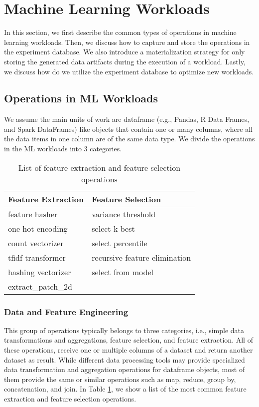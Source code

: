\section{Machine Learning Workloads} \label{sec-ml-workloads}
In this section, we first describe the common types of operations in machine learning workloads.
Then, we discuss how to capture and store the operations in the experiment database.
We also introduce a materialization strategy for only storing the generated data artifacts during the execution of a workload.
Lastly, we discuss how do we utilize the experiment database to optimize new workloads.

\subsection{Operations in ML Workloads}
We assume the main units of work are dataframe (e.g., Pandas, R Data Frames, and Spark DataFrames) like objects that contain one or many columns, where all the data items in one column are of the same data type.
We divide the operations in the ML workloads into 3 categories.
\begin{table}
\centering
\begin{tabular}{ll}
\hline
	   Feature Extraction & Feature Selection\\ \hline
        feature hasher & variance threshold  \\
        one hot encoding & select k best \\
        count vectorizer& select percentile \\ 
        tfidf transformer & recursive feature elimination \\
        hashing vectorizer & select from model \\
        extract\_patch\_2d &  \\
        \hline
\end{tabular}
\caption{List of feature extraction and feature selection operations}\label{feature-engineering-operations}
\end{table}

\subsubsection{Data and Feature Engineering}
This group of operations typically belongs to three categories, i.e., simple data transformations and aggregations, feature selection, and feature extraction.
All of these operations, receive one or multiple columns of a dataset and return another dataset as result. 
While different data processing tools may provide specialized data transformation and aggregation operations for dataframe objects, most of them provide the same or similar operations such as map, reduce, group by, concatenation, and join. 
In Table \ref{feature-engineering-operations}, we show a list of the most common feature extraction and feature selection operations.

